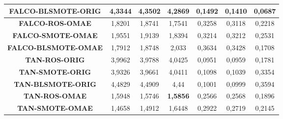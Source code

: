 \begin{table}[H]
{\begin{tabular}{|ccccccc|}
\multicolumn{1}{|c|}{\textbf{FALCO-BLSMOTE-ORIG}} & \multicolumn{1}{c|}{4,3344}           & \multicolumn{1}{c|}{4,3502}             & \multicolumn{1}{c|}{4,2869}          & \multicolumn{1}{c|}{0,1492}           & \multicolumn{1}{c|}{0,1410}             & 0,0687       \\ \hline
\multicolumn{1}{|c|}{\textbf{FALCO-ROS-OMAE}}     & \multicolumn{1}{c|}{1,8201}           & \multicolumn{1}{c|}{1,8741}             & \multicolumn{1}{c|}{1,7541}          & \multicolumn{1}{c|}{0,3258}            & \multicolumn{1}{c|}{0,3118}             & 0,2218       \\ \hline
\multicolumn{1}{|c|}{\textbf{FALCO-SMOTE-OMAE}}   & \multicolumn{1}{c|}{1,9551}           & \multicolumn{1}{c|}{1,9139}             & \multicolumn{1}{c|}{1,8394}          & \multicolumn{1}{c|}{0,3214}            & \multicolumn{1}{c|}{0,3212}             & 0,2531       \\ \hline
\multicolumn{1}{|c|}{\textbf{FALCO-BLSMOTE-OMAE}} & \multicolumn{1}{c|}{1,7912}           & \multicolumn{1}{c|}{1,8748}             & \multicolumn{1}{c|}{2,033}            & \multicolumn{1}{c|}{0,3634}           & \multicolumn{1}{c|}{0,3428}              & 0,1708       \\ \hline
\multicolumn{1}{|c|}{\textbf{TAN-ROS-ORIG}}       & \multicolumn{1}{c|}{3,9962}           & \multicolumn{1}{c|}{3,9788}             & \multicolumn{1}{c|}{4,0425}          & \multicolumn{1}{c|}{0,0951}            & \multicolumn{1}{c|}{0,0959}              & 0,1781       \\ \hline
\multicolumn{1}{|c|}{\textbf{TAN-SMOTE-ORIG}}     & \multicolumn{1}{c|}{3,9326}           & \multicolumn{1}{c|}{3,9661}             & \multicolumn{1}{c|}{4,0411}          & \multicolumn{1}{c|}{0,1098}            & \multicolumn{1}{c|}{0,1039}             & 0,3354       \\ \hline
\multicolumn{1}{|c|}{\textbf{TAN-BLSMOTE-ORIG}}   & \multicolumn{1}{c|}{4,4829}           & \multicolumn{1}{c|}{4,4909}             & \multicolumn{1}{c|}{4,44}             & \multicolumn{1}{c|}{0,1001}            & \multicolumn{1}{c|}{0,0999}             & 0,3594        \\ \hline
\multicolumn{1}{|c|}{\textbf{TAN-ROS-OMAE}}       & \multicolumn{1}{c|}{1,5948}           & \multicolumn{1}{c|}{1,5746}             & \multicolumn{1}{c|}{\textbf{1,5856}} & \multicolumn{1}{c|}{0,2566}           & \multicolumn{1}{c|}{0,2568}             & 0,1896        \\ \hline
\multicolumn{1}{|c|}{\textbf{TAN-SMOTE-OMAE}}     & \multicolumn{1}{c|}{1,4658}           & \multicolumn{1}{c|}{1,4912}             & \multicolumn{1}{c|}{1,6448}          & \multicolumn{1}{c|}{0,2922}           & \multicolumn{1}{c|}{0,2719}             & 0,2145       \\ \hline

\end{tabular}}
\end{table}
